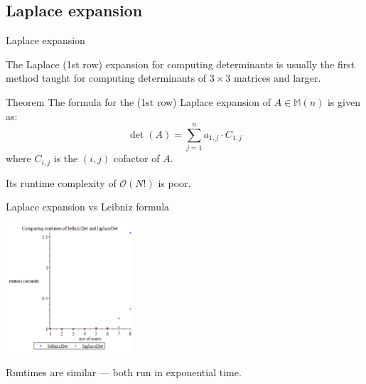 \documentclass{beamer}
\begin{document}
\subsection{Laplace expansion}

\begin{frame}{Laplace expansion}

    The Laplace (1st row) expansion for computing determinants is usually the first method taught
    for computing determinants of $3 \times 3$ matrices and larger.

    \begin{block}{Theorem}
        The formula for the (1st row) Laplace expansion of $A \in \mathbb{M}(n)$
        is given as:
        \[
            \det(A) = \sum_{j=1}^n a_{1,j}\cdot C_{1,j}
        \]
        where $C_{i,j}$ is the $(i, j)$ cofactor of $A$.
    \end{block}

    Its runtime complexity of $\mathcal{O}(N!)$ is poor.

\end{frame}

\begin{frame}{Laplace expansion vs Leibniz formula}

    \begin{center}{}
        \includegraphics[height=180]{leibniz-laplace}
    \end{center}

    Runtimes are similar --- both run in exponential time.

\end{frame}
\end{document}
